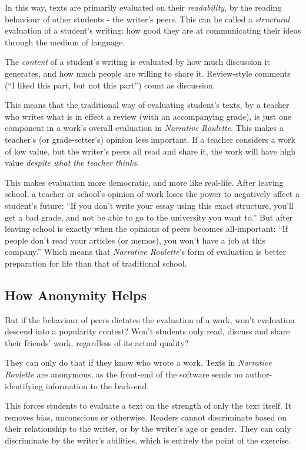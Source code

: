 In this way, texts are primarily evaluated on their \emph{readability},
by the reading behaviour of other students - the writer's peers. This
can be called a \emph{structural} evaluation of a student's writing: how
good they are at communicating their ideas through the medium of
language.

The \emph{content} of a student's writing is evaluated by how much
discussion it generates, and how much people are willing to share it.
Review-style comments (``I liked this part, but not this part'') count
as discussion.

This means that the traditional way of evaluating student's texts, by a
teacher who writes what is in effect a review (with an accompanying
grade), is just one component in a work's overall evaluation in
\emph{Narrative Roulette}. This makes a teacher's (or grade-setter's)
opinion less important. If a teacher considers a work of low value, but
the writer's peers all read and share it, the work will have high value
\emph{despite what the teacher thinks}.

This makes evaluation more democratic, and more like real-life. After
leaving school, a teacher or school's opinion of work loses the power to
negatively affect a student's future: ``If you don't write your essay
using this exact structure, you'll get a bad grade, and not be able to
go to the university you want to.'' But after leaving school is exactly
when the opinions of peers becomes all-important: ``If people don't read
your articles (or memos), you won't have a job at this company.'' Which
means that \emph{Narrative Roulette}'s form of evaluation is better
preparation for life than that of traditional school.

\subsection{How Anonymity Helps}

But if the behaviour of peers dictates the evaluation of a work, won't
evaluation descend into a popularity contest? Won't students only read,
discuss and share their friends' work, regardless of its actual quality?

They can only do that if they know who wrote a work. Texts in
\emph{Narrative Roulette} are anonymous, as the front-end of the
software sends no author-identifying information to the back-end.

This forces students to evaluate a text on the strength of only the text
itself. It removes bias, unconscious or otherwise. Readers cannot
discriminate based on their relationship to the writer, or by the
writer's age or gender. They can only discriminate by the writer's
abilities, which is entirely the point of the exercise.


